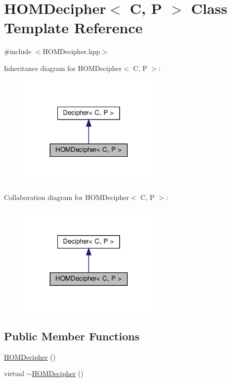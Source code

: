 \hypertarget{classHOMDecipher}{}\section{H\+O\+M\+Decipher$<$ C, P $>$ Class Template Reference}
\label{classHOMDecipher}


{\ttfamily \#include $<$H\+O\+M\+Decipher.\+hpp$>$}



Inheritance diagram for H\+O\+M\+Decipher$<$ C, P $>$\+:
\nopagebreak
\begin{figure}[H]
\begin{center}
\leavevmode
\includegraphics[width=197pt]{classHOMDecipher__inherit__graph}
\end{center}
\end{figure}


Collaboration diagram for H\+O\+M\+Decipher$<$ C, P $>$\+:
\nopagebreak
\begin{figure}[H]
\begin{center}
\leavevmode
\includegraphics[width=197pt]{classHOMDecipher__coll__graph}
\end{center}
\end{figure}
\subsection*{Public Member Functions}
\begin{DoxyCompactItemize}
\item 
\hyperlink{classHOMDecipher_ab98e34714b534c4e02d08d952befa62b}{H\+O\+M\+Decipher} ()
\item 
virtual \hyperlink{classHOMDecipher_ae9f58f01719a48d5bbd41824181e181a}{$\sim$\+H\+O\+M\+Decipher} ()
\end{DoxyCompactItemize}
